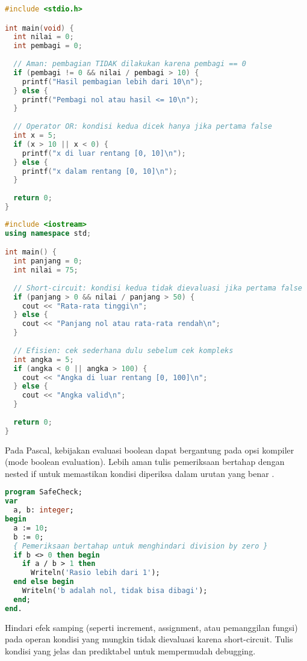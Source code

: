 \documentclass[../main.tex]{subfiles}
\begin{document}
\begin{lstlisting}[language=C, caption={Short-circuit di C untuk keamanan}]
#include <stdio.h>

int main(void) {
  int nilai = 0;
  int pembagi = 0;
  
  // Aman: pembagian TIDAK dilakukan karena pembagi == 0
  if (pembagi != 0 && nilai / pembagi > 10) {
    printf("Hasil pembagian lebih dari 10\n");
  } else {
    printf("Pembagi nol atau hasil <= 10\n");
  }
  
  // Operator OR: kondisi kedua dicek hanya jika pertama false
  int x = 5;
  if (x > 10 || x < 0) {
    printf("x di luar rentang [0, 10]\n");
  } else {
    printf("x dalam rentang [0, 10]\n");
  }
  
  return 0;
}
\end{lstlisting}

\begin{lstlisting}[language=C++, caption={Short-circuit di C++ untuk efisiensi}]
#include <iostream>
using namespace std;

int main() {
  int panjang = 0;
  int nilai = 75;
  
  // Short-circuit: kondisi kedua tidak dievaluasi jika pertama false
  if (panjang > 0 && nilai / panjang > 50) {
    cout << "Rata-rata tinggi\n";
  } else {
    cout << "Panjang nol atau rata-rata rendah\n";
  }
  
  // Efisien: cek sederhana dulu sebelum cek kompleks
  int angka = 5;
  if (angka < 0 || angka > 100) {
    cout << "Angka di luar rentang [0, 100]\n";
  } else {
    cout << "Angka valid\n";
  }
  
  return 0;
}
\end{lstlisting}

Pada Pascal, kebijakan evaluasi boolean dapat bergantung pada opsi kompiler (mode boolean evaluation). Lebih aman tulis pemeriksaan bertahap dengan nested if untuk memastikan kondisi diperiksa dalam urutan yang benar \parencite{free-pascal-docs}.

\begin{lstlisting}[language=Pascal, caption={Pemeriksaan bertahap di Pascal}]
program SafeCheck;
var
  a, b: integer;
begin
  a := 10;
  b := 0;
  { Pemeriksaan bertahap untuk menghindari division by zero }
  if b <> 0 then begin
    if a / b > 1 then
      Writeln('Rasio lebih dari 1');
  end else begin
    Writeln('b adalah nol, tidak bisa dibagi');
  end;
end.
\end{lstlisting}

Hindari efek samping (seperti increment, assignment, atau pemanggilan fungsi) pada operan kondisi yang mungkin tidak dievaluasi karena short-circuit. Tulis kondisi yang jelas dan prediktabel untuk mempermudah debugging.
\end{document}
